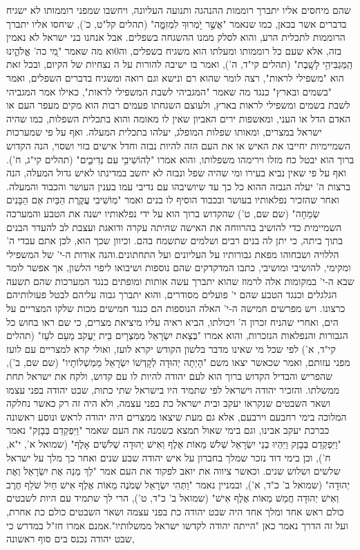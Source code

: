 \documentclass[12pt, openany]{book}
\begin{document}
שהם מיחסים אליו יתברך רוממות ההנהגה ותנועה העליונה, ויחשבו שמפני רוממותו לא ישגיח בדברים אשר בכאן, כמו שנאמר "אֲשֶׁ֣ר יֹ֭מְרוּךָ לִמְזִמָּ֑ה" (תהלים קל"ט, כ'), שיחסו אליו יתברך הרוממות לתכלית הרע, והוא לסלק ממנו ההשגחה בשפלים. אבל אנחנו בני ישראל לא נאמין בזה, אלא שעם כל רוממותו ומעלתו הוא משגיח בשפלים, וה0וא מה שאמר "מִ֭י כה' אֱלֹהֵ֑ינוּ הַֽמַּגְבִּיהִ֥י לָשָֽׁבֶת" (תהלים קי"ד, ה'), ואמר בו ישיבה להורות על ה נצחיות של הקיום, ובכל זאת הוא "משפילי לראות", רצה לומר שהוא רם ונישא וגם רואה ומשגיח בדברים השפלים, ואמר "בשמים ובארץ" כנגד מה שאמר "המגביהי לשבת המשפילי לראות", כאילו אמר המגביהי לשבת בשמים ומשפילי לראות בארץ, ולעוצם השגחתו פעמים רבות הוא מקים מעפר העם או האדם הדל או העני, ומאשפות ירים האביון שאין לו מאומה והוא בתכלית השפלות, כמו שהיה ישראל במצרים, ומאותו שפלות המופלג, יעלהו בתכלית המעלה. ואף על פי שמערכות השמיימיות יחייבו את האיש או את העם הזה להיות נבזה וחדל אישים בזוי ושסוי, הנה הקדוש ברוך הוא יבטל כח מזלו וירימהו משפלותו, והוא אמרו "לְהוֹשִׁיבִ֥י עִם נְדִיבִ֑ים" (תהלים קי"ג, ח'). ואף על פי שאין נביא בעירו ומי שהיה שפל ונבזה לא יחשב במדינתו לאיש גדול המעלה, הנה ברצות ה' יעלה הנבזה ההוא כל כך עד שיושיבהו עם נדיבי עמו בענין העושר והכבוד והמעלה. ואחר שהזכיר נפלאותיו בעושר ובכבוד הוסיף לו בנים ואמר "מֽוֹשִׁיבִי עֲקֶרֶת הַבַּיִת אֵם הַבָּנִים שְׂמֵחָה" (שם שם, ט') שהקדוש ברוך הוא על ידי נפלאותיו ישנה את הטבע והמערכה השמיימית כדי להושיב בהרווחה את האישה שהיתה עקרה ודואגת ועצבת לב להעדר הבנים בתוך ביתה, כי יתן לה בנים רבים ושלמים שתשמח בהם. וכיוון שכך הוא, לכן אתם עבדי ה' הללויה ושבחוהו מפאת גבורותיו על העליונים ועל התחתונים.והנה אודות ה-י' של המשפילי ומקימי, להושיבי ומושיבי, כתבו המדקדקים שהם נוספות ושיבואו ליפוי הלשון, אך אפשר לומר שבא ה-י' במקומות אלה לרמוז שהוא יתברך עשה אותות ומופתים כנגד המערכות שהם תשעה הגלגלים וכנגד הטבע שהם י' פועלים מסודרים, והוא יתברך גבוה עליהם לבטל פעולותיהם כרצונו. ויש מפרשים חמישה ה-י' האלה הנוספות הם כנגד חמישים מכות שלקו המצריים על הים, ואחרי שהניח זכרון ה' ויכולתו, הביא ראיה עליו מיציאת מצרים, כי שם ראו בחוש כל הגבורות והנפלאות הנזכרות, והוא אמרו "בְּצֵאת יִשְׂרָאֵל מִמִּצְרָיִם בֵּית יַעֲקֹב מֵעַם לֹעֵז" (תהלים קי"ד, א') לפי שכל מי שאינו מדבר בלשון הקודש יקרא לועז, ואולי קרא למצריים עם לועז מפני עזותם, ואמר שכאשר יצאו משם "הָיְתָה יְהוּדָה לְקָדְשׁוֹ יִשְׂרָאֵל מַמְשְׁלוֹתָיו" (שם שם, ב'), שהפריש והבדיל הקדוש ברוך הוא לעם יהודה להיות לו עם קדוש, ולקח את ישראל תחת ממשלתו. והזכיר יהודה וישראל לפי שתמיד היו בישראל שתי כתות, שבט יהודה בפני עצמו ושאר השבטים שנקראו יעקב ובית ישראל כת בפני עצמה, ולא היה זה רק כאשר נחלקה המלוכה בימי רחבעם וירבעם, אלא גם מעת שיצאו ממצרים היה יהודה לראש ונוסע ראשונה כברכת יעקב אבינו, וגם בימי שאול תמצא כשמנה את העם שאמר "וַיִּפְקְדֵם בְּבָזֶק" נאמר "וַיִּפְקְדֵם בְּבָזֶק וַיִּהְיוּ בְנֵי יִשְׂרָאֵל שְׁלֹשׁ מֵאוֹת אֶלֶף וְאִישׁ יְהוּדָה שְׁלֹשִׁים אָלֶף" (שמואל א', י"א, ח'), וכן בימי דוד נזכר שמלך בחברון על איש יהודה שבע שנים ואחר כך מלך על ישראל שלשים ושלוש שנים. וכאשר ציווה את יואב לפקוד את העם אמר "לֵךְ מְנֵה אֶת יִשְׂרָאֵל וְאֶת יְהוּדָה" (שמואל ב' כ"ד, א'), ובמניין נאמר "וַתְּהִי יִשְׂרָאֵל שְׁמֹנֶה מֵאוֹת אֶלֶף אִישׁ חַיִל שֹׁלֵף חֶרֶב וְאִישׁ יְהוּדָה חֲמֵשׁ מֵאוֹת אֶלֶף אִישׁ" (שמואל ב' כ"ד, ט'), הרי לך שתמיד עם היות לשבטים כולם ראש אחד ומלך אחד היה שבט יהודה כת בפני עצמה ושאר השבטים כולם כת אחרת, ועל זה הדרך נאמר כאן "הייתה יהודה לקדשו ישראל ממשלותיו".אמנם אמרו חז"ל במדרש כי שבט יהודה נכנס בים סוף ראשונה, 
\end{document}
